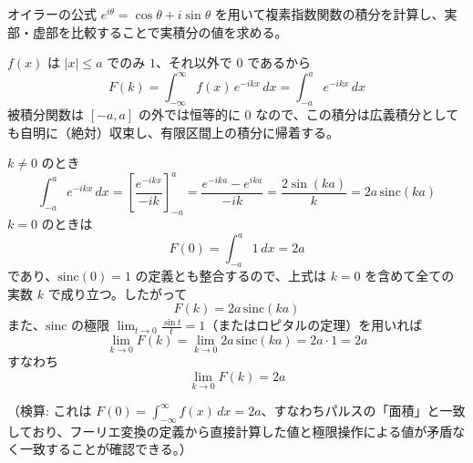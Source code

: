 
オイラーの公式 $e^{i\theta} = \cos\theta + i\sin\theta$ を用いて複素指数関数の積分を計算し、実部・虚部を比較することで実積分の値を求める。

$f(x)$ は $|x|\le a$ でのみ $1$、それ以外で $0$ であるから
\[
F(k) = \int_{-\infty}^{\infty} f(x)\,e^{-ikx}\,dx = \int_{-a}^{a} e^{-ikx}\,dx
\]
被積分関数は $[-a,a]$ の外では恒等的に $0$ なので、この積分は広義積分としても自明に（絶対）収束し、有限区間上の積分に帰着する。

$k \neq 0$ のとき
\[
\int_{-a}^{a} e^{-ikx}\,dx = \left[\frac{e^{-ikx}}{-ik}\right]_{-a}^{a} = \frac{e^{-ika}-e^{ika}}{-ik} = \frac{2\sin(ka)}{k} = 2a\,\mathrm{sinc}(ka)
\]
$k=0$ のときは
\[
F(0) = \int_{-a}^{a} 1\,dx = 2a
\]
であり、$\mathrm{sinc}(0)=1$ の定義とも整合するので、上式は $k=0$ を含めて全ての実数 $k$ で成り立つ。したがって
\[
\boxed{\; F(k) = 2a\,\mathrm{sinc}(ka) \;}
\]
また、$\mathrm{sinc}$ の極限 $\displaystyle\lim_{t\to 0}\frac{\sin t}{t} = 1$（またはロピタルの定理）を用いれば
\[
\lim_{k\to 0} F(k) = \lim_{k\to 0} 2a\,\mathrm{sinc}(ka) = 2a\cdot 1 = 2a
\]
すなわち
\[
\boxed{\; \lim_{k\to 0} F(k) = 2a \;}
\]

（検算: これは $F(0) = \int_{-\infty}^{\infty} f(x)\,dx = 2a$、すなわちパルスの「面積」と一致しており、フーリエ変換の定義から直接計算した値と極限操作による値が矛盾なく一致することが確認できる。）

